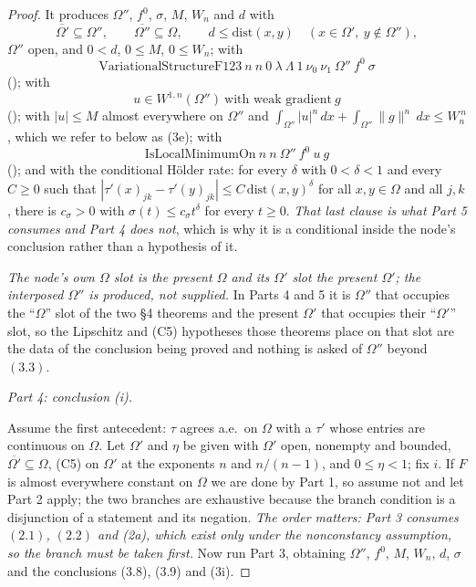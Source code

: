 \begin{proof}
It produces $\Omega''$, $f^0$, $\sigma$, $M$, $W_n$ and $d$ with
\[
\overline{\Omega'}\subseteq\Omega'',\qquad
\overline{\Omega''}\subseteq\Omega,\qquad
d\le\mathrm{dist}(x,y)\quad(x\in\Omega',\ y\notin\Omega''),
\tag{3.3}
\]
$\Omega''$ open, and $0<d$, $0\le M$, $0\le W_n$; with
\[
\mathrm{VariationalStructureF123}\ n\ n\ 0\ \lambda\ \Lambda\ 1\ \nu_0\ \nu_1\
\Omega''\ f^0\ \sigma
\tag{3i}
\]
(); with
\[
u\in W^{1,n}(\Omega'')\ \text{with weak gradient}\ g
\tag{3.9}
\]
(); with $|u|\le M$ almost everywhere on $\Omega''$ and
$\int_{\Omega''}|u|^n\,dx+\int_{\Omega''}\|g\|^n\,dx\le W_n^{\,n}$, which we
refer to below as (3e); with
\[
\mathrm{IsLocalMinimumOn}\ n\ n\ \Omega''\ f^0\ u\ g
\tag{3.8}
\]
(); and with the conditional H\"older rate: for every
$\delta$ with $0<\delta<1$ and every $C\ge0$ such that
$|\tau'(x)_{jk}-\tau'(y)_{jk}|\le C\,\mathrm{dist}(x,y)^\delta$ for all
$x,y\in\Omega$ and all $j,k$, there is $c_\sigma>0$ with
$\sigma(t)\le c_\sigma t^\delta$ for every $t\ge0$.  \emph{That last clause is
what Part 5 consumes and Part 4 does not}, which is why it is a conditional
inside the node's conclusion rather than a hypothesis of it.

\emph{The node's own $\Omega$ slot is the present $\Omega$ and its $\Omega'$ slot
the present $\Omega'$; the interposed $\Omega''$ is produced, not supplied.}  In
Parts 4 and 5 it is $\Omega''$ that occupies the ``$\Omega$'' slot of the two
\S4 theorems and the present $\Omega'$ that occupies their ``$\Omega'$'' slot, so
the Lipschitz and (C5) hypotheses those theorems place on that slot are the data
of the conclusion being proved and nothing is asked of $\Omega''$ beyond
$(3.3)$.

\medskip
\noindent\emph{Part 4: conclusion \textup{(i)}.}

Assume the first antecedent: $\tau$ agrees a.e.\ on $\Omega$ with a $\tau'$ whose
entries are continuous on $\Omega$.  Let $\Omega'$ and $\eta$ be given with
$\Omega'$ open, nonempty and bounded, $\overline{\Omega'}\subseteq\Omega$, (C5)
on $\Omega'$ at the exponents $n$ and $n/(n-1)$, and $0\le\eta<1$; fix $i$.  If
$F$ is almost everywhere constant on $\Omega$ we are done by Part 1, so assume
not and let Part 2 apply; the two branches are exhaustive because the branch
condition is a disjunction of a statement and its negation.  \emph{The order
matters: Part 3 consumes $(2.1)$, $(2.2)$ and (2a), which exist only under the
nonconstancy assumption, so the branch must be taken first.}  Now run Part 3,
obtaining $\Omega''$, $f^0$, $M$, $W_n$, $d$, $\sigma$ and the conclusions
(3.8), (3.9) and (3i).


\end{proof}
